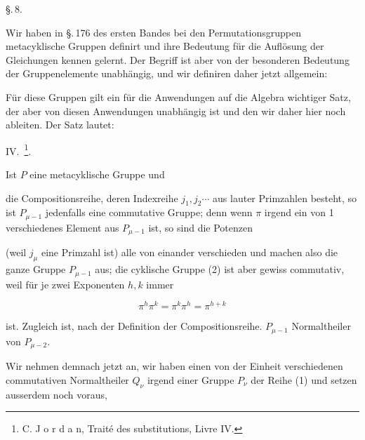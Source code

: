 
\begin{center}
\S.\,8.

\end{center}

Wir haben in \S.\,176 des ersten Bandes bei den Permutationsgruppen
 metacyklische Gruppen definirt und ihre Bedeutung
für die Auflösung der Gleichungen kennen gelernt. Der Begriff
ist aber von der besonderen Bedeutung der Gruppenelemente
unabhängig, und wir definiren daher jetzt allgemein:


Für diese Gruppen gilt ein für die Anwendungen auf die
Algebra wichtiger Satz, der aber von diesen Anwendungen unabhängig
 ist und den wir daher hier noch ableiten. Der Satz
lautet:

IV.\ \footnote{C. J o r d a n, Traité des substitutions, Livre IV.}.

Ist $P$ eine metacyklische Gruppe und


die Compositionsreihe, deren Indexreihe $j_1, j_2 \cdots$ aus lauter
Primzahlen besteht, so ist $P_{\mu-1}$ jedenfalls eine commutative
Gruppe; denn wenn $\pi$ irgend ein von 1 verschiedenes Element
aus $P_{\mu-1}$ ist, so sind die Potenzen


(weil $j_\mu$ eine Primzahl ist) alle von einander verschieden und
machen also die ganze Gruppe $P_{\mu-1}$ aus; die cyklische Gruppe (2)
ist aber gewiss commutativ, weil für je zwei Exponenten $h, k$
immer

\[
\pi^h \pi^k = \pi^k \pi^h = \pi^{h+k}
\]

ist. Zugleich ist, nach der Definition der Compositionsreihe. %
$P_{\mu-1}$ Normaltheiler von $P_{\mu-2}$.

Wir nehmen demnach jetzt an, wir haben einen von der
Einheit verschiedenen commutativen Normaltheiler $Q_\nu$ irgend
einer Gruppe $P_\nu$ der Reihe (1) und setzen ausserdem noch voraus,
